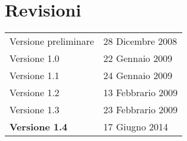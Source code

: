 \chapter*{Revisioni}

\begin{table}[htbp]
\begin{center}
\begin{tabular}{ll}
Versione preliminare & 28 Dicembre 2008 \\
Versione 1.0 & 22 Gennaio 2009  \\ 
Versione 1.1 & 24 Gennaio 2009        \\
Versione 1.2 & 13 Febbrario 2009     \\
Versione 1.3 & 23 Febbrario 2009 \\
\textbf{Versione 1.4} & 17 Giugno 2014 \\
\end{tabular}
\end{center}
\end{table}


